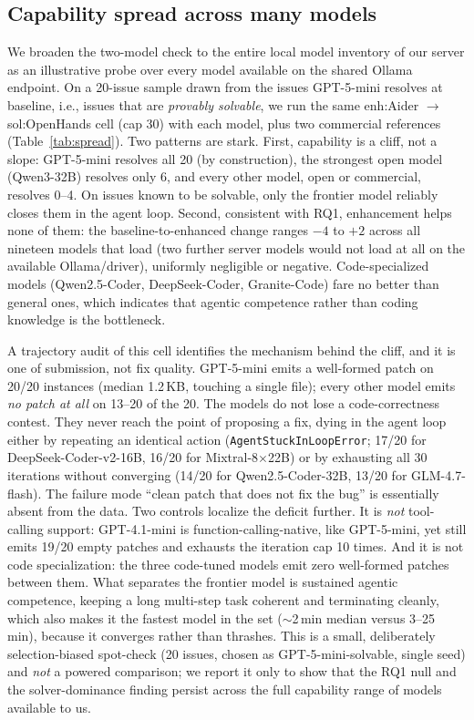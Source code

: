 \documentclass[journal]{IEEEtran}
\begin{document}
\subsection{Capability spread across many models}
\label{sec:spread}
We broaden the two-model check to the entire local model inventory of our server as an illustrative probe over every model available on the shared Ollama endpoint. On a 20-issue sample drawn from the issues GPT-5-mini resolves at baseline, i.e., issues that are \emph{provably solvable}, we run the same enh:Aider $\rightarrow$ sol:OpenHands cell (cap 30) with each model, plus two commercial references (Table~\ref{tab:spread}). Two patterns are stark. First, capability is a cliff, not a slope: GPT-5-mini resolves all 20 (by construction), the strongest open model (Qwen3-32B) resolves only 6, and every other model, open or commercial, resolves 0--4. On issues known to be solvable, only the frontier model reliably closes them in the agent loop. Second, consistent with RQ1, enhancement helps none of them: the baseline-to-enhanced change ranges $-4$ to $+2$ across all nineteen models that load (two further server models would not load at all on the available Ollama/driver), uniformly negligible or negative. Code-specialized models (Qwen2.5-Coder, DeepSeek-Coder, Granite-Code) fare no better than general ones, which indicates that agentic competence rather than coding knowledge is the bottleneck.

A trajectory audit of this cell identifies the mechanism behind the cliff, and it is one of submission, not fix quality. GPT-5-mini emits a well-formed patch on 20/20 instances (median 1.2\,KB, touching a single file); every other model emits \emph{no patch at all} on 13--20 of the 20. The models do not lose a code-correctness contest. They never reach the point of proposing a fix, dying in the agent loop either by repeating an identical action (\texttt{AgentStuckInLoopError}; 17/20 for DeepSeek-Coder-v2-16B, 16/20 for Mixtral-8$\times$22B) or by exhausting all 30 iterations without converging (14/20 for Qwen2.5-Coder-32B, 13/20 for GLM-4.7-flash). The failure mode ``clean patch that does not fix the bug'' is essentially absent from the data. Two controls localize the deficit further. It is \emph{not} tool-calling support: GPT-4.1-mini is function-calling-native, like GPT-5-mini, yet still emits 19/20 empty patches and exhausts the iteration cap 10 times. And it is not code specialization: the three code-tuned models emit zero well-formed patches between them. What separates the frontier model is sustained agentic competence, keeping a long multi-step task coherent and terminating cleanly, which also makes it the fastest model in the set ($\sim$2\,min median versus 3--25\,min), because it converges rather than thrashes. This is a small, deliberately selection-biased spot-check (20 issues, chosen as GPT-5-mini-solvable, single seed) and \emph{not} a powered comparison; we report it only to show that the RQ1 null and the solver-dominance finding persist across the full capability range of models available to us.
\end{document}
